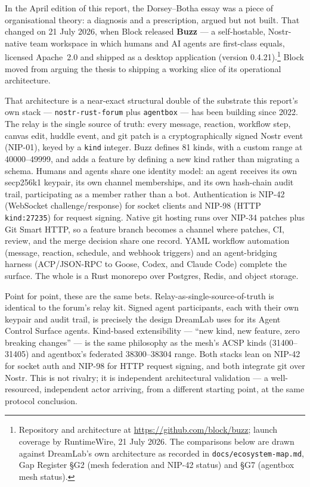 In the April edition of this report, the Dorsey--Botha essay \parencite{DorseyBotha2026} was a piece of organisational theory: a diagnosis and a prescription, argued but not built. That changed on 21 July 2026, when Block released \textbf{Buzz} --- a self-hostable, Nostr-native team workspace in which humans and AI agents are first-class equals, licensed Apache~2.0 and shipped as a desktop application (version 0.4.21).\footnote{Repository and architecture at \url{https://github.com/block/buzz}; launch coverage by RuntimeWire, 21 July 2026. The comparisons below are drawn against DreamLab's own architecture as recorded in \texttt{docs/ecosystem-map.md}, Gap Register \S G2 (mesh federation and NIP-42 status) and \S G7 (agentbox mesh status).} Block moved from arguing the thesis to shipping a working slice of its operational architecture.

That architecture is a near-exact structural double of the substrate this report's own stack --- \texttt{nostr-rust-forum} plus \texttt{agentbox} --- has been building since 2022. The relay is the single source of truth: every message, reaction, workflow step, canvas edit, huddle event, and git patch is a cryptographically signed Nostr event (NIP-01), keyed by a \texttt{kind} integer. Buzz defines 81 kinds, with a custom range at 40000--49999, and adds a feature by defining a new kind rather than migrating a schema. Humans and agents share one identity model: an agent receives its own secp256k1 keypair, its own channel memberships, and its own hash-chain audit trail, participating as a member rather than a bot. Authentication is NIP-42 (WebSocket challenge/response) for socket clients and NIP-98 (HTTP \texttt{kind:27235}) for request signing. Native git hosting runs over NIP-34 patches plus Git Smart HTTP, so a feature branch becomes a channel where patches, CI, review, and the merge decision share one record. YAML workflow automation (message, reaction, schedule, and webhook triggers) and an agent-bridging harness (ACP/JSON-RPC to Goose, Codex, and Claude Code) complete the surface. The whole is a Rust monorepo over Postgres, Redis, and object storage.

Point for point, these are the same bets. Relay-as-single-source-of-truth is identical to the forum's relay kit. Signed agent participants, each with their own keypair and audit trail, is precisely the design DreamLab uses for its Agent Control Surface agents. Kind-based extensibility --- ``new kind, new feature, zero breaking changes'' --- is the same philosophy as the mesh's ACSP kinds (31400--31405) and agentbox's federated 38300--38304 range. Both stacks lean on NIP-42 for socket auth and NIP-98 for HTTP request signing, and both integrate git over Nostr. This is not rivalry; it is independent architectural validation --- a well-resourced, independent actor arriving, from a different starting point, at the same protocol conclusion.

